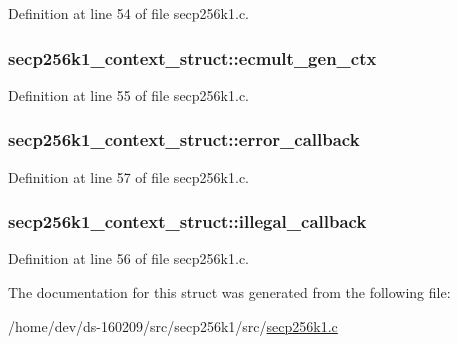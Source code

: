 Definition at line 54 of file secp256k1.\+c.

\hypertarget{structsecp256k1__context__struct_aacc2071a68f9c5a6c05eb783f523b9eb}{}
\subsubsection[{ecmult\+\_\+gen\+\_\+ctx}]{ secp256k1\+\_\+context\+\_\+struct\+::ecmult\+\_\+gen\+\_\+ctx}\label{structsecp256k1__context__struct_aacc2071a68f9c5a6c05eb783f523b9eb}


Definition at line 55 of file secp256k1.\+c.

\hypertarget{structsecp256k1__context__struct_aa34a996f869676899e8625adfb6c6f1d}{}
\subsubsection[{error\+\_\+callback}]{ secp256k1\+\_\+context\+\_\+struct\+::error\+\_\+callback}\label{structsecp256k1__context__struct_aa34a996f869676899e8625adfb6c6f1d}


Definition at line 57 of file secp256k1.\+c.

\hypertarget{structsecp256k1__context__struct_a6f73572b18e62b306c5699e9e1470ab5}{}
\subsubsection[{illegal\+\_\+callback}]{ secp256k1\+\_\+context\+\_\+struct\+::illegal\+\_\+callback}\label{structsecp256k1__context__struct_a6f73572b18e62b306c5699e9e1470ab5}


Definition at line 56 of file secp256k1.\+c.



The documentation for this struct was generated from the following file\+:\begin{DoxyCompactItemize}
\item 
/home/dev/ds-\/160209/src/secp256k1/src/\hyperlink{secp256k1_8c}{secp256k1.\+c}\end{DoxyCompactItemize}
